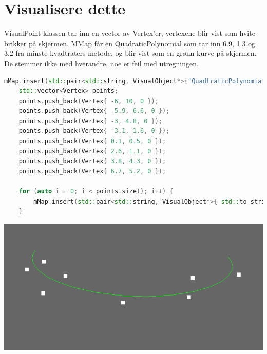 \documentclass[a4paper,norsk]{article}
\begin{document}
\section{Visualisere dette}
VisualPoint klassen tar inn en vector av Vertex'er, vertexene blir vist som hvite brikker på skjermen. MMap får en QuadraticPolynomial som tar inn 6.9, 1.3 og 3.2 fra minste kvadtraters metode, og blir vist som en grønn kurve på skjermen.
De stemmer ikke med hverandre, noe er feil med utregningen.
\begin{lstlisting}[language=C++, caption={renderwindow.cpp}]
mMap.insert(std::pair<std::string, VisualObject*>{"QuadtraticPolynomial", new QuadtraticPolynomial(0.145f, -0.268f, 1.3f, 0.1f)});
    std::vector<Vertex> points;
    points.push_back(Vertex{ -6, 10, 0 });
    points.push_back(Vertex{ -5.9, 6.6, 0 });
    points.push_back(Vertex{ -3, 4.8, 0 });
    points.push_back(Vertex{ -3.1, 1.6, 0 });
    points.push_back(Vertex{ 0.1, 0.5, 0 });
    points.push_back(Vertex{ 2.6, 1.1, 0 });
    points.push_back(Vertex{ 3.8, 4.3, 0 });
    points.push_back(Vertex{ 6.7, 5.2, 0 });

    for (auto i = 0; i < points.size(); i++) {
        mMap.insert(std::pair<std::string, VisualObject*>{ std::to_string(i) , new VisualPoint(points)});
    }
\end{lstlisting}
\centering
\includegraphics[width=\textwidth]{MatteOblig2Minstekvadratersmetode}
\end{document}
